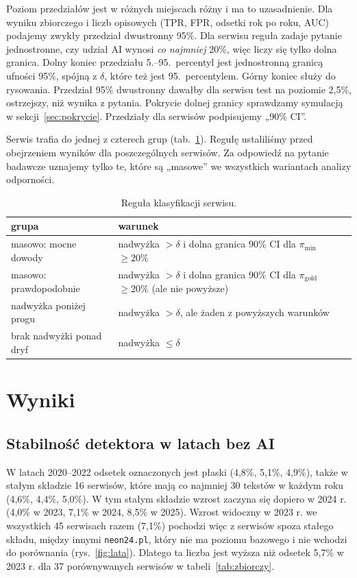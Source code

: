 \documentclass[11pt,a4paper]{article}
\newcommand{\pimin}{\ensuremath{\pi_{\mathrm{min}}}}
\newcommand{\pigold}{\ensuremath{\pi_{\mathrm{gold}}}}
\newcommand{\dom}[1]{\texttt{#1}}
\begin{document}
Poziom przedziałów jest w różnych miejscach różny i ma to uzasadnienie. Dla wyniku zbiorczego i liczb opisowych (TPR, FPR, odsetki rok po roku, AUC) podajemy zwykły przedział dwustronny 95\%. Dla serwisu reguła zadaje pytanie jednostronne, czy udział AI wynosi \emph{co najmniej} 20\%, więc liczy się tylko dolna granica. Dolny koniec przedziału 5.--95.\ percentyl jest jednostronną granicą ufności 95\%, spójną z $\delta$, które też jest 95.\ percentylem. Górny koniec służy do rysowania. Przedział 95\% dwustronny dawałby dla serwisu test na poziomie 2,5\%, ostrzejszy, niż wynika z pytania. Pokrycie dolnej granicy sprawdzamy symulacją w sekcji~\ref{sec:pokrycie}. Przedziały dla serwisów podpisujemy „90\% CI”.

Serwis trafia do jednej z czterech grup (tab.~\ref{tab:regula}). Regułę ustaliliśmy przed obejrzeniem wyników dla poszczególnych serwisów. Za odpowiedź na pytanie badawcze uznajemy tylko te, które są „masowe” we wszystkich wariantach analizy odporności.

\begin{table}[t]
\centering\small
\caption{Reguła klasyfikacji serwisu.}\label{tab:regula}
\begin{tabular}{@{}p{3.6cm}p{11cm}@{}}
\toprule
grupa & warunek \\
\midrule
masowo: mocne dowody & nadwyżka $>\delta$ i dolna granica 90\% CI dla \pimin{} $\geq 20\%$ \\
masowo: prawdopodobnie & nadwyżka $>\delta$ i dolna granica 90\% CI dla \pigold{} $\geq 20\%$ (ale nie powyższe) \\
nadwyżka poniżej progu & nadwyżka $>\delta$, ale żaden z powyższych warunków \\
brak nadwyżki ponad dryf & nadwyżka $\leq\delta$ \\
\bottomrule
\end{tabular}
\end{table}

\section{Wyniki}

\subsection{Stabilność detektora w latach bez AI}

W latach 2020--2022 odsetek oznaczonych jest płaski (4,8\%, 5,1\%, 4,9\%), także w stałym składzie 16 serwisów, które mają co najmniej 30 tekstów w każdym roku (4,6\%, 4,4\%, 5,0\%). W tym stałym składzie wzrost zaczyna się dopiero w 2024 r. (4,0\% w 2023, 7,1\% w 2024, 8,5\% w 2025). Wzrost widoczny w 2023 r. we wszystkich 45 serwisach razem (7,1\%) pochodzi więc z serwisów spoza stałego składu, między innymi \dom{neon24.pl}, który nie ma poziomu bazowego i nie wchodzi do porównania (rys.~\ref{fig:lata}). Dlatego ta liczba jest wyższa niż odsetek 5,7\% w 2023 r. dla 37 porównywanych serwisów w tabeli~\ref{tab:zbiorczy}.
\end{document}
